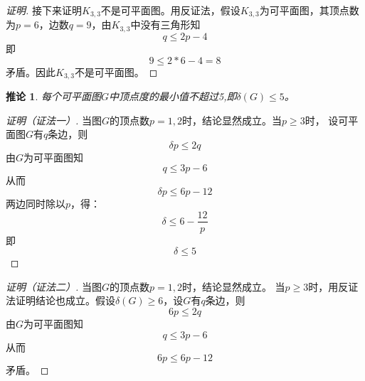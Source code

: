 \documentclass{book}[oneside]
\newtheorem{Cor}{推论}[chapter]
\begin{document}
\begin{CJK*}{UTF8}{gbsn}
\begin{proof}[证明]
  接下来证明$K_{3,3}$不是可平面图。用反证法，假设$K_{3,3}$为可平面图，其顶点数为$p=6$，边数$q=9$，由$K_{3,3}$中没有三角形知
  \[q \leq 2p -4\]
  即
  \[9 \leq 2 * 6 - 4 = 8\]
  矛盾。因此$K_{3,3}$不是可平面图。
\end{proof}
  \begin{Cor}
    每个可平面图$G$中顶点度的最小值不超过5,即$\delta (G) \leq 5$。
  \end{Cor}
  \begin{proof}[证明（证法一）]
  当图$G$的顶点数$p=1,2$时，结论显然成立。当$p\geq 3$时，
  设可平面图$G$有$q$条边，则
  \[\delta p \leq 2q\]
  由$G$为可平面图知
  \[q \leq 3p - 6\]
  从而
  \[\delta p \leq 6p - 12\]
  两边同时除以$p$，得：
  \[\delta \leq 6 - \frac{12}{p}\]
  即
  \[\delta \leq 5\]
\end{proof}
\begin{proof}[证明（证法二）]
  当图$G$的顶点数$p=1,2$时，结论显然成立。
  当$p \geq 3$时，用反证法证明结论也成立。假设$\delta (G) \geq 6$，设$G$有$q$条边，则
  \[6p \leq 2q\]
  由$G$为可平面图知
  \[q \leq 3p - 6\]
  从而
  \[6p \leq 6p - 12\]
矛盾。  
\end{proof}


\end{CJK*}
\end{document}
